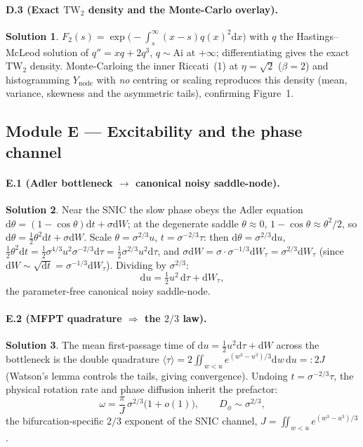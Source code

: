 \documentclass[11pt]{article}
\newcommand{\TW}{\mathrm{TW}}
\newcommand{\Ai}{\mathrm{Ai}}
\newcommand{\dd}{\mathrm{d}}
\newcommand{\Ynode}{Y_{\mathrm{node}}}
\theoremstyle{definition}
\newtheorem*{sol}{Solution}
\begin{document}
\paragraph{D.3 (Exact $\TW_2$ density and the Monte-Carlo overlay).}
\begin{sol}
$F_2(s)=\exp\!\bigl(-\int_s^\infty(x-s)q(x)^2\dd x\bigr)$ with $q$ the Hastings--McLeod solution
of $q''=xq+2q^3$, $q\sim\Ai$ at $+\infty$; differentiating gives the exact $\TW_2$ density.
Monte-Carloing the inner Riccati~(1) at $\eta=\sqrt2$ ($\beta=2$) and histogramming $\Ynode$ with
\emph{no} centring or scaling reproduces this density (mean, variance, skewness and the asymmetric
tails), confirming Figure~1.
\end{sol}

\subsection*{Module E --- Excitability and the phase channel}

\paragraph{E.1 (Adler bottleneck $\to$ canonical noisy saddle-node).}
\begin{sol}
Near the SNIC the slow phase obeys the Adler equation $\dd\theta=(1-\cos\theta)\dd t+\sigma\dd W$;
at the degenerate saddle $\theta\approx0$, $1-\cos\theta\approx\theta^2/2$, so
$\dd\theta=\tfrac12\theta^2\dd t+\sigma\dd W$. Scale $\theta=\sigma^{2/3}u$, $t=\sigma^{-2/3}\tau$:
then $\dd\theta=\sigma^{2/3}\dd u$, $\tfrac12\theta^2\dd t=\tfrac12\sigma^{4/3}u^2\sigma^{-2/3}\dd\tau
=\tfrac12\sigma^{2/3}u^2\dd\tau$, and $\sigma\dd W=\sigma\cdot\sigma^{-1/3}\dd W_\tau=\sigma^{2/3}\dd W_\tau$
(since $\dd W\sim\sqrt{\dd t}=\sigma^{-1/3}\dd W_\tau$). Dividing by $\sigma^{2/3}$:
\[
\dd u=\tfrac12u^2\,\dd\tau+\dd W_\tau,
\]
the parameter-free canonical noisy saddle-node.
\end{sol}

\paragraph{E.2 (MFPT quadrature $\Rightarrow$ the $2/3$ law).}
\begin{sol}
The mean first-passage time of $\dd u=\tfrac12u^2\dd\tau+\dd W$ across the bottleneck is the
double quadrature $\langle\tau\rangle=2\iint_{w<u}e^{(w^3-u^3)/3}\dd w\,\dd u=:2J$ (Watson's lemma
controls the tails, giving convergence). Undoing $t=\sigma^{-2/3}\tau$, the physical rotation rate
and phase diffusion inherit the prefactor:
\[
\omega=\frac{\pi}{J}\,\sigma^{2/3}\bigl(1+o(1)\bigr),\qquad D_\phi\sim\sigma^{2/3},
\]
the bifurcation-specific $2/3$ exponent of the SNIC channel, $J=\iint_{w<u}e^{(w^3-u^3)/3}$.
\end{sol}
\end{document}

